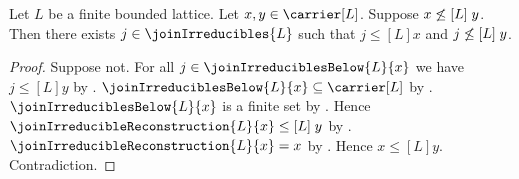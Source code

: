 \begin{theorem}\label{join_irreducible_separates_not_leq}
    Let $L$ be a finite bounded lattice.
    Let $x,y\in\carrier[L]$.
    Suppose $x\not\mathrel{\leq[L]}y$.
    Then there exists $j\in\joinIrreducibles{L}$ such that
        $j\mathrel{\leq[L]}x$ and $j\not\mathrel{\leq[L]}y$.
\end{theorem}
\begin{proof}
    Suppose not.
    For all $j\in\joinIrreduciblesBelow{L}{x}$ we have
        $j\mathrel{\leq[L]}y$ by
        .
    $\joinIrreduciblesBelow{L}{x}\subseteq\carrier[L]$ by
        .
    $\joinIrreduciblesBelow{L}{x}$ is a finite set by
        .
    Hence $\joinIrreducibleReconstruction{L}{x}
        \mathrel{\leq[L]}y$ by
        .
    $\joinIrreducibleReconstruction{L}{x}=x$ by
        .
    Hence $x\mathrel{\leq[L]}y$.
    Contradiction.
\end{proof}
